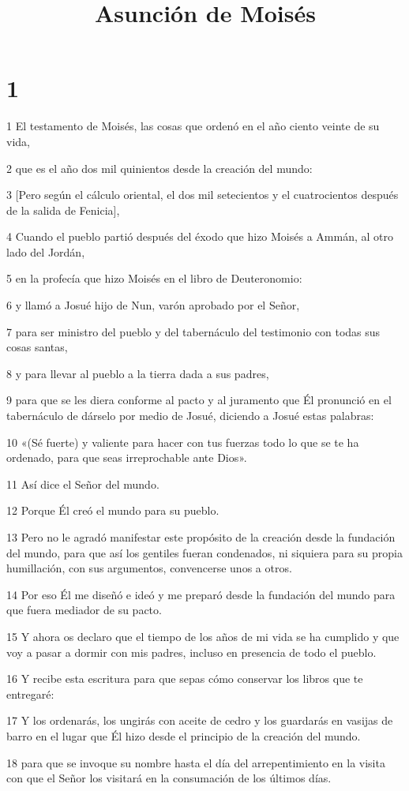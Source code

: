 

\title{Asunción de Moisés}

\chapter{1}

\par 1 El testamento de Moisés, las cosas que ordenó en el año ciento veinte de su vida,
\par 2 que es el año dos mil quinientos desde la creación del mundo:
\par 3 [Pero según el cálculo oriental, el dos mil setecientos y el cuatrocientos después de la salida de Fenicia],
\par 4 Cuando el pueblo partió después del éxodo que hizo Moisés a Ammán, al otro lado del Jordán,
\par 5 en la profecía que hizo Moisés en el libro de Deuteronomio:
\par 6 y llamó a Josué hijo de Nun, varón aprobado por el Señor,
\par 7 para ser ministro del pueblo y del tabernáculo del testimonio con todas sus cosas santas,
\par 8 y para llevar al pueblo a la tierra dada a sus padres,
\par 9 para que se les diera conforme al pacto y al juramento que Él pronunció en el tabernáculo de dárselo por medio de Josué, diciendo a Josué estas palabras:
\par 10 «(Sé fuerte) y valiente para hacer con tus fuerzas todo lo que se te ha ordenado, para que seas irreprochable ante Dios».
\par 11 Así dice el Señor del mundo.
\par 12 Porque Él creó el mundo para su pueblo.
\par 13 Pero no le agradó manifestar este propósito de la creación desde la fundación del mundo, para que así los gentiles fueran condenados, ni siquiera para su propia humillación, con sus argumentos, convencerse unos a otros.
\par 14 Por eso Él me diseñó e ideó y me preparó desde la fundación del mundo para que fuera mediador de su pacto.
\par 15 Y ahora os declaro que el tiempo de los años de mi vida se ha cumplido y que voy a pasar a dormir con mis padres, incluso en presencia de todo el pueblo.
\par 16 Y recibe esta escritura para que sepas cómo conservar los libros que te entregaré:
\par 17 Y los ordenarás, los ungirás con aceite de cedro y los guardarás en vasijas de barro en el lugar que Él hizo desde el principio de la creación del mundo.
\par 18 para que se invoque su nombre hasta el día del arrepentimiento en la visita con que el Señor los visitará en la consumación de los últimos días.

